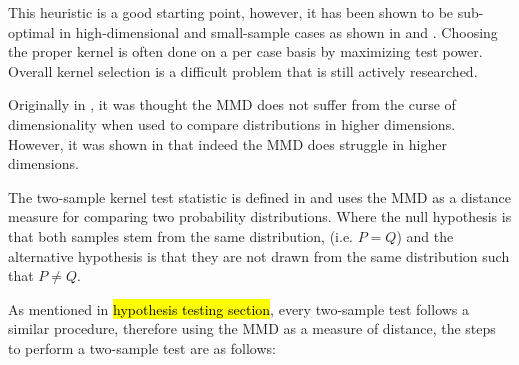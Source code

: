 This heuristic is a good starting point, however, it has been shown to be sub-optimal in high-dimensional and small-sample cases as shown in \cite{muandet2014kernel} and \cite{ramdas2015decreasing}. Choosing the proper kernel is often done on a per case basis by maximizing test power. Overall kernel selection is a difficult problem that is still actively researched.

Originally in \cite{gretton2012kernel}, it was thought the MMD does not suffer from the curse of dimensionality when used to compare distributions in higher dimensions. However, it was shown in \cite{ramdas2015decreasing} that indeed the MMD does struggle in higher dimensions.

\iffalse
\hl{REWORD: We call the function that achieves the supremum, the witness function because it is the function that witnesses the difference in the two distributions. This means that we can interpret the witness function as showing where the estimated densities of
p and q are most different.}

The witness function 
\begin{equation}
f(x)=\mathbb{E}_{x^{\prime} \sim p}\left[k\left(x, x^{\prime}\right)\right]-\mathbb{E}_{x^{\prime} \sim q}\left[k\left(x, x^{\prime}\right)\right]
\end{equation}

which can also be estimated from finite samples of data by:
\begin{equation}
\hat{f}(x)=\frac{1}{m} \sum_{i=1}^{m} k\left(x, x_{i}\right)-\frac{1}{n} \sum_{i=1}^{n} k\left(x, y_{i}\right)
\end{equation}
Thus, as [need citation] points at, the witness function tracks where the densities of $X$ and $Y$ are most different. 
Kernel selection is important because it decides the kind of witness functions that can be learned. For most applications it is simply set to the RBF kernel but ideally it should be selected based on maximizing test power.
\fi 
 
The two-sample kernel test statistic is defined in \cite{gretton2012kernel} and uses the MMD as a distance measure for comparing two probability distributions. Where the null hypothesis is that both samples stem from the same distribution,  (i.e. $P=Q$) and the alternative hypothesis is that they are not drawn from the same distribution such that $P \neq Q$.

As mentioned in \hl{hypothesis testing section}, every two-sample test follows a similar procedure, therefore using the MMD as a measure of distance, the steps to perform a two-sample test  are as follows:

